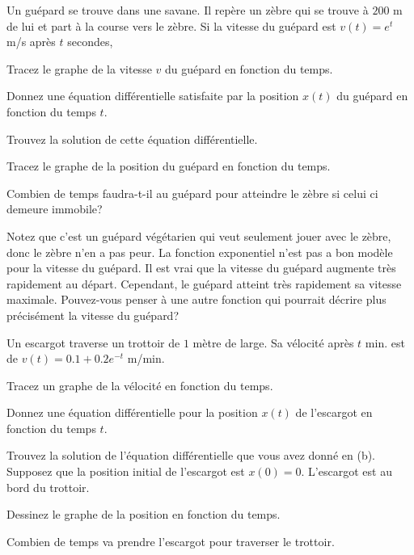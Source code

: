 \begin{question}[\life]
Un guépard se trouve dans une savane.  Il repère un zèbre qui se trouve à
$200$ m de lui et part à la course vers le zèbre.  Si la vitesse du guépard
est $v(t) = e^t$ m/s après $t$ secondes,

 Tracez le graphe de la vitesse $v$ du guépard en fonction du
temps.

 Donnez une équation différentielle satisfaite par la position
$x(t)$ du guépard en fonction du temps $t$.

 Trouvez la solution de cette équation différentielle.

 Tracez le graphe de la position du guépard en fonction du temps.

 Combien de temps faudra-t-il au guépard pour atteindre le zèbre si
celui ci demeure immobile?

Notez que c'est un guépard végétarien qui veut seulement jouer avec le
zèbre, donc le zèbre n'en a pas peur.  La fonction exponentiel n'est
pas a bon modèle pour la vitesse du guépard.  Il est vrai que la
vitesse du guépard augmente très rapidement au départ.  Cependant, le
guépard atteint très rapidement sa vitesse maximale.  Pouvez-vous
penser à une autre fonction qui pourrait décrire plus précisément la
vitesse du guépard? 
\label{10Q6}
\end{question}

\begin{question}[\life]
Un escargot traverse un trottoir de $1$ mètre de large.  Sa vélocité après
$t$ min. est de $v(t) = 0.1+ 0.2 e^{-t}$ m/min. 

 Tracez un graphe de la vélocité en fonction du temps.

 Donnez une équation différentielle pour la position $x(t)$ de
l'escargot en fonction du temps $t$.

 Trouvez la solution de l'équation différentielle que vous avez donné
en (b).  Supposez que la position initial de l'escargot
est $x(0)=0$.  L'escargot est au bord du trottoir.

 Dessinez le graphe de la position en fonction du temps.

 Combien de temps va prendre l'escargot pour traverser le trottoir.
\label{10Q7}
\end{question}

